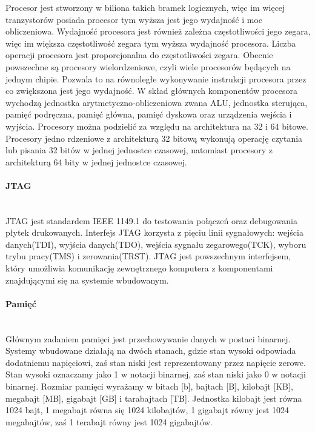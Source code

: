 \documentclass[12p]{article}
\begin{document}
Procesor jest stworzony w biliona takich bramek logicznych, więc im więcej tranzystorów posiada procesor tym wyższa jest jego wydajność i moc obliczeniowa. Wydajność procesora jest również zależna częstotliwości jego zegara, więc im większa częstotliwość zegara tym wyższa wydajność procesora. Liczba operacji procesora jest proporcjonalna do częstotliwości zegara. Obecnie powszechne są procesory wielordzeniowe, czyli wiele procesorów będących na jednym chipie. Pozwala to na równoległe wykonywanie instrukcji procesora przez co zwiększona jest jego wydajność. W skład głównych komponentów procesora wychodzą jednostka arytmetyczno-obliczeniowa zwana ALU, jednostka sterująca, pamięć podręczna, pamięć główna, pamięć dyskowa oraz urządzenia wejścia i wyjścia. Procesory można podzielić za względu na architektura na 32 i 64 bitowe. Procesory jedno rdzeniowe z architekturą 32 bitową wykonują operację czytania lub pisania 32 bitów w jednej jednostce czasowej, natomiast procesory z architekturą 64 bity w jednej jednostce czasowej.  




\paragraph{JTAG} \mbox{} \\

JTAG jest standardem IEEE 1149.1 do testowania połączeń oraz debugowania płytek drukowanych. Interfejs JTAG korzysta z pięciu linii sygnałowych: wejścia danych(TDI), wyjścia danych(TDO), wejścia sygnału zegarowego(TCK), wyboru trybu pracy(TMS) i zerowania(TRST). JTAG jest powszechnym interfejsem, który umożliwia komunikację zewnętrznego komputera z komponentami znajdującymi się na systemie wbudowanym.

\paragraph{Pamięć} \mbox{} \\

Głównym zadaniem pamięci jest przechowywanie danych w postaci binarnej. Systemy wbudowane działają na dwóch stanach, gdzie stan wysoki odpowiada dodatniemu napięciowi, zaś stan niski jest reprezentowany przez napięcie zerowe. Stan wysoki oznaczamy jako 1 w notacji binarnej, zaś stan niski jako 0 w notacji binarnej. Rozmiar pamięci wyrażamy w bitach [b], bajtach [B], kilobajt [KB], megabajt [MB], gigabajt [GB] i tarabajtach [TB]. Jednostka kilobajt jest równa 1024 bajt, 1 megabajt równa się 1024 kilobajtów, 1 gigabajt równy jest 1024 megabajtów, zaś 1 terabajt równy jest 1024 gigabajtów. 
\end{document}

